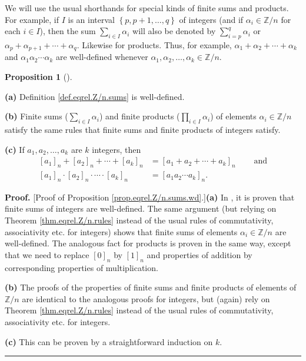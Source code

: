 \documentclass[numbers=enddot,12pt,final,onecolumn,notitlepage]{scrartcl}%
\numberwithin{exer}{subsection}
\theoremstyle{definition}
\newtheorem{prop}[theo]{Proposition}
\newenvironment{proposition}[1][]
{\begin{prop}[#1]\begin{leftbar}}
{\end{leftbar}\end{prop}}
\newenvironment{proof}[1][Proof]{\noindent\textbf{#1.} }{\ \rule{0.5em}{0.5em}}
\let\sumnonlimits\sum
\let\prodnonlimits\prod
\renewcommand{\sum}{\sumnonlimits\limits}
\renewcommand{\prod}{\prodnonlimits\limits}
\begin{document}
We will use the usual shorthands for special kinds of finite sums and
products. For example, if $I$ is an interval $\left\{  p,p+1,\ldots,q\right\}
$ of integers (and if $\alpha_{i}\in\mathbb{Z}/n$ for each $i\in I$), then the
sum $\sum_{i\in I}\alpha_{i}$ will also be denoted by $\sum_{i=p}^{q}%
\alpha_{i}$ or $\alpha_{p}+\alpha_{p+1}+\cdots+\alpha_{q}$. Likewise for
products. Thus, for example, $\alpha_{1}+\alpha_{2}+\cdots+\alpha_{k}$ and
$\alpha_{1}\alpha_{2}\cdots\alpha_{k}$ are well-defined whenever $\alpha
_{1},\alpha_{2},\ldots,\alpha_{k}\in\mathbb{Z}/n$.

\begin{proposition}
\label{prop.eqrel.Z/n.sums.wd}\textbf{(a)} Definition \ref{def.eqrel.Z/n.sums}
is well-defined.

\textbf{(b)} Finite sums ($\sum_{i\in I}\alpha_{i}$) and finite products
($\prod_{i\in I}\alpha_{i}$) of elements $\alpha_{i}\in\mathbb{Z}/n$ satisfy
the same rules that finite sums and finite products of integers satisfy.

\textbf{(c)} If $a_{1},a_{2},\ldots,a_{k}$ are $k$ integers, then
\begin{align*}
\left[  a_{1}\right]  _{n}+\left[  a_{2}\right]  _{n}+\cdots+\left[
a_{k}\right]  _{n}  &  =\left[  a_{1}+a_{2}+\cdots+a_{k}\right]
_{n}\ \ \ \ \ \ \ \ \ \ \text{and}\\
\left[  a_{1}\right]  _{n}\cdot\left[  a_{2}\right]  _{n}\cdot\cdots
\cdot\left[  a_{k}\right]  _{n}  &  =\left[  a_{1}a_{2}\cdots a_{k}\right]
_{n}.
\end{align*}

\end{proposition}

\begin{proof}
[Proof of Proposition \ref{prop.eqrel.Z/n.sums.wd}.]\textbf{(a)} In
\cite[Theorem 2.118 \textbf{(a)}]{detnotes}, it is proven that finite sums of
integers are well-defined. The same argument (but relying on Theorem
\ref{thm.eqrel.Z/n.rules} instead of the usual rules of commutativity,
associativity etc. for integers) shows that finite sums of elements
$\alpha_{i}\in\mathbb{Z}/n$ are well-defined. The analogous fact for products
is proven in the same way, except that we need to replace $\left[  0\right]
_{n}$ by $\left[  1\right]  _{n}$ and properties of addition by corresponding
properties of multiplication.

\textbf{(b)} The proofs of the properties of finite sums and finite products
of elements of $\mathbb{Z}/n$ are identical to the analogous proofs for
integers, but (again) rely on Theorem \ref{thm.eqrel.Z/n.rules} instead of the
usual rules of commutativity, associativity etc. for integers.

\textbf{(c)} This can be proven by a straightforward induction on $k$.
\end{proof}
\end{document}
